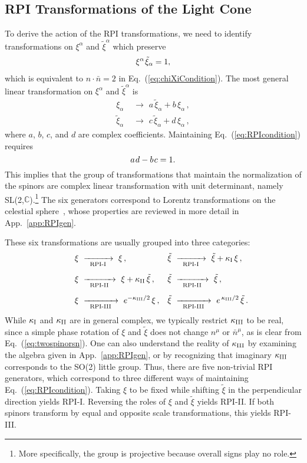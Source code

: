\documentclass[12pt,document,nofootinbib,superscriptaddress,onecolumn,preprintnumbers,balancelastpage]{article}
\newcommand{\s}{\hspace{0.8pt}}
\newcommand{\RPIi}{\,\,\xrightarrow[\hspace{5pt}\text{RPI-I}\hspace{5pt}]{}\,\,}
\newcommand{\RPIii}{\,\,\xrightarrow[\hspace{5pt}\text{RPI-II}\hspace{5pt}]{}\,\,}
\newcommand{\RPIiii}{\,\,\xrightarrow[\hspace{5pt}\text{RPI-III}\hspace{5pt}]{}\,\,}
\DeclareRobustCommand{\App}[1]{App.~\ref{#1}}
\DeclareRobustCommand{\Eq}[1]{Eq.~(\ref{#1})}
\begin{document}
\begin{spacing}{1.2}
\subsection{RPI Transformations of the Light Cone}

To derive the action of the RPI transformations, we need to identify transformations on $\xi^\alpha$ and $\tilde{\xi}^\alpha$ which preserve 
\begin{align}
\xi^\alpha \s\tilde{\xi}_\alpha = 1,
\label{eq:RPIcondition}
\end{align}
which is equivalent to $n\cdot \bar{n} = 2$ in \Eq{eq:chiXiCondition}.
%
The most general linear transformation on $\xi^\alpha$ and $\tilde{\xi}^\alpha$ is  
\begin{align}
\xi_\alpha \,\,&\longrightarrow\,\, a \, \tilde{\xi}_\alpha  +b \, \xi_\alpha \,,\label{eq:PreRPI-II}\\[5pt]
\tilde{\xi}_\alpha \,\,&\longrightarrow\,\, c \, \tilde{\xi}_\alpha+d\, \xi_\alpha\,, \label{eq:PreRPI-I}
\end{align}
where $a$, $b$, $c$, and $d$ are complex coefficients.
%
Maintaining \Eq{eq:RPIcondition} requires 
\begin{equation}
 a\s d-b\s c = 1.
\end{equation}
This implies that the group of transformations that maintain the normalization of the spinors are complex linear transformation with unit determinant, namely SL(2,$\mathbb{C}$).\footnote{More specifically, the group is projective because overall signs play no role.}
%
The six generators correspond to Lorentz transformations on the celestial sphere~\cite{Larkoski:2014bxa}, whose properties are reviewed in more detail in \App{app:RPIgen}.

These six transformations are usually grouped into three categories: 
% 
\begin{align}
\xi & \RPIi  \xi \,, & \tilde{\xi} &\RPIi \tilde{\xi}+ \kappa_{\rm I} \,  \xi\,, \label{eq:RPI1}\\[5pt]
\quad \quad \xi & \RPIii  \xi+ \kappa_{\rm II} \, \tilde{\xi}\,,& \tilde{\xi} &\RPIii  \tilde{\xi}\,, \label{eq:RPI2}\\[5pt]
\quad \quad \xi &\RPIiii   e^{-\kappa_{\rm III}/2} \, \xi\,, &\tilde{\xi} &\RPIiii  e^{\,\kappa_{\rm III}/2} \, \tilde{\xi}\,. \label{eq:RPI3}
\end{align}
%
While $\kappa_{\rm I}$ and $\kappa_{\rm II}$ are in general complex, we typically restrict $\kappa_{\rm III}$ to be real, since a simple phase rotation of $\xi$ and $\tilde{\xi}$ does not change $n^\mu$ or $\bar{n}^\mu$, as is clear from \Eq{eq:twospinorsn}.
%
One can also understand the reality of $\kappa_{\rm III}$  by examining the algebra given in \App{app:RPIgen}, or by recognizing that imaginary $\kappa_{\rm III}$ corresponds to the SO(2) little group.
%
Thus, there are five non-trivial RPI generators, which correspond to three different ways of maintaining \Eq{eq:RPIcondition}.
%
Taking $\xi$ to be fixed while shifting $\tilde{\xi}$ in the perpendicular direction yields RPI-I.
%
Reversing the roles of $\xi$ and $\tilde{\xi}$ yields RPI-II.
%
If both spinors transform by equal and opposite scale transformations, this yields RPI-III.
%


\end{spacing}
\end{document}
